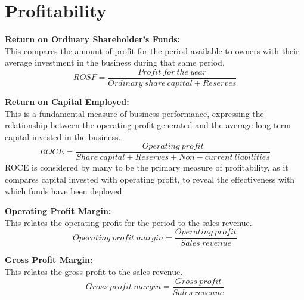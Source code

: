 \documentclass{report}
\newenvironment{blackbox}[1][Black]
  {\begin{tcolorbox}[colframe=#1,colback=white]}
  {\end{tcolorbox}}
\begin{document}
\section{Profitability}

\begin{blackbox}
    \textbf{Return on Ordinary Shareholder's Funds:}\\
    This compares the amount of profit for the period available to owners with their average investment in the business during that same period.
    \begin{equation}
        ROSF = \frac{Profit \: for \: the \: year}{Ordinary \: share \: capital + Reserves}
    \end{equation}
\end{blackbox}

\begin{blackbox}
    \textbf{Return on Capital Employed:}\\
    This is a fundamental measure of business performance, expressing the relationship between the operating profit generated and the average long-term capital invested in the business.
    \begin{equation}
        ROCE = \frac{Operating \: profit}{Share \: capital +  Reserves + Non-current \: liabilities}
    \end{equation}
    ROCE is considered by many to be the primary measure of profitability, as it compares capital invested with operating profit, to reveal the effectiveness with which funds have been deployed.
\end{blackbox}

\begin{blackbox}
    \textbf{Operating Profit Margin:}\\
    This relates the operating profit for the period to the sales revenue.
    \begin{equation}
        Operating \: profit \: margin = \frac{Operating \: profit}{Sales \: revenue}
    \end{equation}
\end{blackbox}

\begin{blackbox}
    \textbf{Gross Profit Margin:}\\
    This relates the gross profit to the sales revenue.
    \begin{equation}
        Gross \: profit \: margin = \frac{Gross \: profit}{Sales \: revenue}
    \end{equation}
\end{blackbox}
\end{document}
